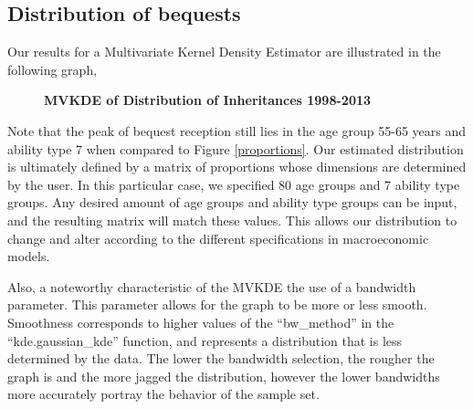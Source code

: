 \documentclass[letterpaper,12pt]{article}
\newcommand{\quotes}[1]{``#1''}
\theoremstyle{definition}
\begin{document}
\begin{spacing}{1.5}
  \subsection{Distribution of bequests}\label{SecDistEst}

    Our results for a Multivariate Kernel Density Estimator are illustrated in the following graph,\\

    \begin{figure}[htbp]\centering \captionsetup{width=6.0in}
    \caption{\label{MVKDE}\textbf{MVKDE of Distribution of Inheritances 1998-2013}}
  \end{figure}

\newpage
 Note that the peak of bequest reception still lies in the age group 55-65 years and ability type 7 when compared to Figure \ref{proportions}. Our estimated distribution is ultimately defined by a matrix of proportions whose dimensions are determined by the user. In this particular case, we specified 80 age groups and 7 ability type groups. Any desired amount of age groups and ability type groups can be input, and the resulting matrix will match these values. This allows our distribution to change and alter according to the different specifications in macroeconomic models.

 Also, a noteworthy characteristic of the MVKDE the use of a bandwidth parameter. This parameter allows for the graph to be more or less smooth. Smoothness corresponds to higher values of the \quotes{bw\_method} in the \quotes{kde.gaussian\_kde} function, and represents a distribution that is less determined by the data. The lower the bandwidth selection, the rougher the graph is and the more jagged the distribution, however the lower bandwidths more accurately portray the behavior of the sample set. 



\end{spacing}
\end{document}
